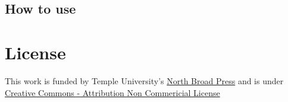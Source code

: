 \subsection{How to use}

\section{License}
This work is funded by Temple University's \href{http://tupress.temple.edu/open-access/north-broad-press}{North Broad Press} and is under \href{https://creativecommons.org/licenses/by-nc/3.0/}{Creative Commons - Attribution Non Commericial License}



